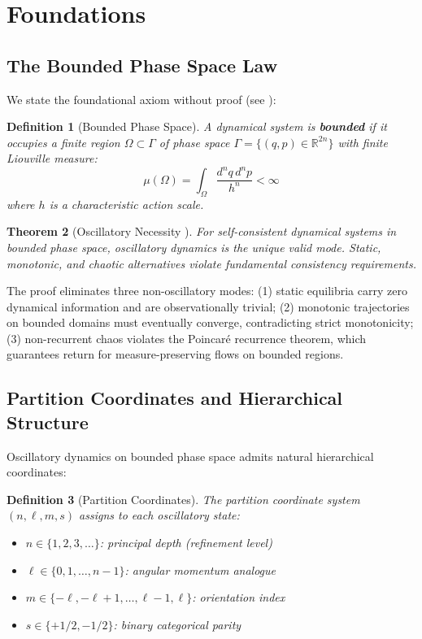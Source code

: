 \documentclass[11pt,a4paper]{article}
\newtheorem{theorem}{Theorem}[section]
\newtheorem{definition}[theorem]{Definition}
\begin{document}
\section{Foundations}

\subsection{The Bounded Phase Space Law}

We state the foundational axiom without proof (see \cite{Paper6}):

\begin{definition}[Bounded Phase Space]
A dynamical system is \textbf{bounded} if it occupies a finite region $\Omega \subset \Gamma$ of phase space $\Gamma = \{(q,p) \in \mathbb{R}^{2n}\}$ with finite Liouville measure:
\begin{equation}
\mu(\Omega) = \int_\Omega \frac{d^n q \, d^n p}{h^n} < \infty
\end{equation}
where $h$ is a characteristic action scale.
\end{definition}

\begin{theorem}[Oscillatory Necessity \cite{Paper6}]
For self-consistent dynamical systems in bounded phase space, oscillatory dynamics is the unique valid mode. Static, monotonic, and chaotic alternatives violate fundamental consistency requirements.
\end{theorem}

The proof eliminates three non-oscillatory modes: (1) static equilibria carry zero dynamical information and are observationally trivial; (2) monotonic trajectories on bounded domains must eventually converge, contradicting strict monotonicity; (3) non-recurrent chaos violates the Poincar\'e recurrence theorem, which guarantees return for measure-preserving flows on bounded regions.

\subsection{Partition Coordinates and Hierarchical Structure}

Oscillatory dynamics on bounded phase space admits natural hierarchical coordinates:

\begin{definition}[Partition Coordinates]
The partition coordinate system $(n, \ell, m, s)$ assigns to each oscillatory state:
\begin{itemize}
\item $n \in \{1,2,3,\ldots\}$: principal depth (refinement level)
\item $\ell \in \{0,1,\ldots,n-1\}$: angular momentum analogue
\item $m \in \{-\ell, -\ell+1, \ldots, \ell-1, \ell\}$: orientation index
\item $s \in \{+1/2, -1/2\}$: binary categorical parity
\end{itemize}
\end{definition}
\end{document}
